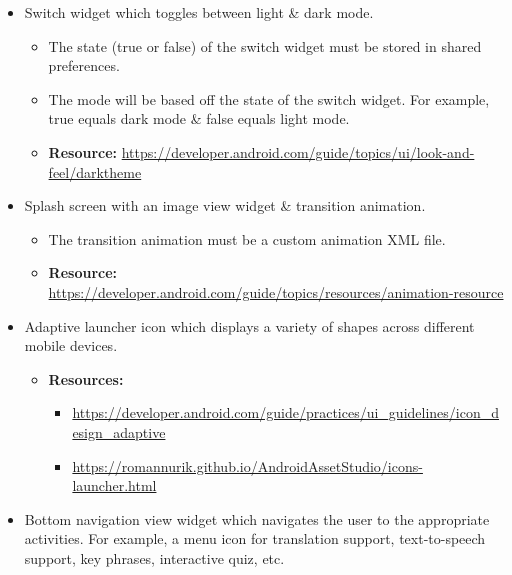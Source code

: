 \documentclass{article}
\begin{document}
\begin{itemize}
\begin{itemize}
	      \end{itemize}
	\item Switch widget which toggles between light \& dark mode. 
	      \begin{itemize}
	      	\item The state (true or false) of the switch widget must be stored in shared preferences.
	      	\item The mode will be based off the state of the switch widget. For example, true equals dark mode \& false equals light mode.
	      \end{itemize}
	      \begin{itemize}
	      	\item \textbf{Resource:} \footnotesize\href{https://developer.android.com/guide/topics/ui/look-and-feel/darktheme}{https://developer.android.com/guide/topics/ui/look-and-feel/darktheme}
	      \end{itemize}
	\item Splash screen with an image view widget \& transition animation.
	      \begin{itemize}
	      	\item The transition animation must be a custom animation XML file.
	      	\item \textbf{Resource:} \footnotesize\href{https://developer.android.com/guide/topics/resources/animation-resource}{https://developer.android.com/guide/topics/resources/animation-resource}
	      \end{itemize}
	\item Adaptive launcher icon which displays a variety of shapes across different mobile devices.
	      \begin{itemize}
	      	\item \textbf{Resources:}
	      	      \begin{itemize}
	      	      	\item \footnotesize\href{https://developer.android.com/guide/practices/ui\_guidelines/icon\_design\_adaptive}{https://developer.android.com/guide/practices/ui\_guidelines/icon\_design\_adaptive}
	      	      	\item \footnotesize\href{https://romannurik.github.io/AndroidAssetStudio/icons-launcher.html}{https://romannurik.github.io/AndroidAssetStudio/icons-launcher.html} 
	      	      \end{itemize}
	      \end{itemize}
	\item Bottom navigation view widget which navigates the user to the appropriate activities. For example, a menu icon for translation support, text-to-speech support, key phrases, interactive quiz, etc.

\end{itemize}
\end{document}
